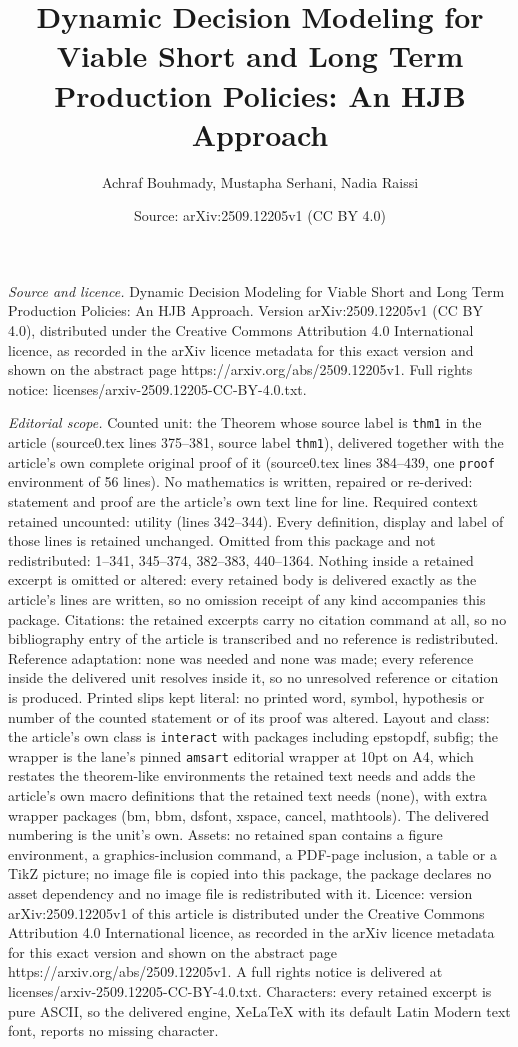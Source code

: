 \documentclass[10pt,a4paper]{amsart}
\title[Dynamic Decision Modeling for Viable Short and Long Term Pro]{Dynamic Decision Modeling for Viable Short and Long Term Production Policies: An HJB Approach}
\author{Achraf Bouhmady, Mustapha Serhani, Nadia Raissi}
\date{Source: arXiv:2509.12205v1 (CC BY 4.0)}
\begin{document}
\maketitle

\noindent\emph{Source and licence.} Dynamic Decision Modeling for Viable Short and Long Term Production Policies: An HJB Approach. Version arXiv:2509.12205v1 (CC BY 4.0), distributed under the Creative Commons Attribution 4.0 International licence, as recorded in the arXiv licence metadata for this exact version and shown on the abstract page https://arxiv.org/abs/2509.12205v1. Full rights notice: licenses/arxiv-2509.12205-CC-BY-4.0.txt.\par\smallskip

\noindent\textit{Editorial scope.} Counted unit: the Theorem whose source label is \texttt{thm1} in the article (source0.tex lines 375--381, source label \texttt{thm1}), delivered together with the article's own complete original proof of it (source0.tex lines 384--439, one \texttt{proof} environment of 56 lines). No mathematics is written, repaired or re-derived: statement and proof are the article's own text line for line. Required context retained uncounted: utility (lines 342--344). Every definition, display and label of those lines is retained unchanged. Omitted from this package and not redistributed: 1--341, 345--374, 382--383, 440--1364. Nothing inside a retained excerpt is omitted or altered: every retained body is delivered exactly as the article's lines are written, so no omission receipt of any kind accompanies this package. Citations: the retained excerpts carry no citation command at all, so no bibliography entry of the article is transcribed and no reference is redistributed. Reference adaptation: none was needed and none was made; every reference inside the delivered unit resolves inside it, so no unresolved reference or citation is produced. Printed slips kept literal: no printed word, symbol, hypothesis or number of the counted statement or of its proof was altered. Layout and class: the article's own class is \texttt{interact} with packages including epstopdf, subfig; the wrapper is the lane's pinned \texttt{amsart} editorial wrapper at 10pt on A4, which restates the theorem-like environments the retained text needs and adds the article's own macro definitions that the retained text needs (none), with extra wrapper packages (bm, bbm, dsfont, xspace, cancel, mathtools). The delivered numbering is the unit's own. Assets: no retained span contains a figure environment, a graphics-inclusion command, a PDF-page inclusion, a table or a TikZ picture; no image file is copied into this package, the package declares no asset dependency and no image file is redistributed with it. Licence: version arXiv:2509.12205v1 of this article is distributed under the Creative Commons Attribution 4.0 International licence, as recorded in the arXiv licence metadata for this exact version and shown on the abstract page https://arxiv.org/abs/2509.12205v1. A full rights notice is delivered at licenses/arxiv-2509.12205-CC-BY-4.0.txt. Characters: every retained excerpt is pure ASCII, so the delivered engine, XeLaTeX with its default Latin Modern text font, reports no missing character.
\end{document}
